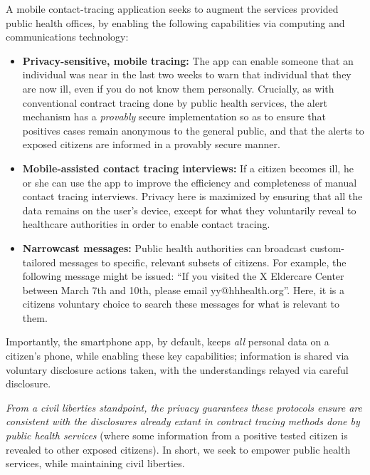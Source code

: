 \documentclass{article}
\begin{document}
A mobile contact-tracing application seeks to augment the services provided public health offices, by enabling the following capabilities via computing and communications technology:

\begin{itemize}
\item \textbf{Privacy-sensitive, mobile tracing:}  The app can enable someone that an individual was near in the last two weeks to warn that individual that they are now ill, even if you do not know them personally.  Crucially, as with conventional contract tracing done by public health services, the alert mechanism has a \emph{provably} secure implementation so as to ensure that positives cases remain anonymous to the general public, and that the alerts to exposed citizens are informed in a provably secure manner.

\item \textbf{Mobile-assisted contact tracing interviews:}  If a citizen becomes ill, he or she can use the app to improve the efficiency and completeness of manual contact tracing interviews. Privacy here is maximized by ensuring that all the data remains on the user's device, except for what they voluntarily reveal to healthcare authorities in order to enable contact tracing.

\item \textbf{Narrowcast messages:}  Public health authorities can broadcast
  custom-tailored messages to specific, relevant subsets of citizens.  For example, the following message might be issued: ``If you visited
  the X Eldercare Center between March 7th and 10th, please email yy@hhhealth.org''.  Here, it is a citizens voluntary choice to search these messages for what is relevant to them.
  
\end{itemize}

Importantly, the smartphone app, by default, keeps \emph{all} personal data on a citizen's phone, while enabling these key capabilities; information is shared via voluntary disclosure actions taken, with the understandings relayed via careful disclosure. 

\emph{From a civil liberties standpoint, the privacy guarantees these protocols ensure are consistent with the disclosures already extant in contract tracing methods done by public health services} (where some information from a positive tested citizen is revealed to other exposed citizens). In short, we seek to empower public health services, while maintaining civil liberties.
 
\end{document}
